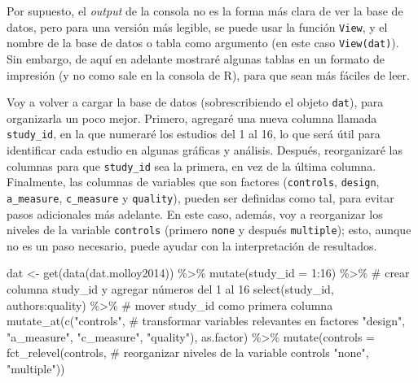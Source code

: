 \documentclass[
  bookmarksnumbered]{article}
\newenvironment{Shaded}{\begin{snugshade}}{\end{snugshade}}
\newcommand{\AttributeTok}[1]{\textcolor[rgb]{0.00,0.34,0.68}{#1}}
\newcommand{\CommentTok}[1]{\textcolor[rgb]{0.54,0.53,0.53}{#1}}
\newcommand{\DecValTok}[1]{\textcolor[rgb]{0.69,0.50,0.00}{#1}}
\newcommand{\FunctionTok}[1]{\textcolor[rgb]{0.39,0.29,0.61}{#1}}
\newcommand{\NormalTok}[1]{\textcolor[rgb]{0.12,0.11,0.11}{#1}}
\newcommand{\OtherTok}[1]{\textcolor[rgb]{0.00,0.43,0.16}{#1}}
\newcommand{\SpecialCharTok}[1]{\textcolor[rgb]{0.24,0.68,0.91}{#1}}
\newcommand{\StringTok}[1]{\textcolor[rgb]{0.75,0.01,0.01}{#1}}
\begin{document}
Por supuesto, el \emph{output} de la consola no es la forma más clara de ver la base de datos, pero para una versión más legible, se puede usar la función \texttt{View}, y el nombre de la base de datos o tabla como argumento (en este caso \texttt{View(dat)}). Sin embargo, de aquí en adelante mostraré algunas tablas en un formato de impresión (y no como sale en la consola de R), para que sean más fáciles de leer.

Voy a volver a cargar la base de datos (sobrescribiendo el objeto \texttt{dat}), para organizarla un poco mejor. Primero, agregaré una nueva columna llamada \texttt{study\_id}, en la que numeraré los estudios del 1 al 16, lo que será útil para identificar cada estudio en algunas gráficas y análisis. Después, reorganizaré las columnas para que \texttt{study\_id} sea la primera, en vez de la última columna. Finalmente, las columnas de variables que son factores (\texttt{controls}, \texttt{design}, \texttt{a\_measure}, \texttt{c\_measure} y \texttt{quality}), pueden ser definidas como tal, para evitar pasos adicionales más adelante. En este caso, además, voy a reorganizar los niveles de la variable \texttt{controls} (primero \texttt{none} y después \texttt{multiple}); esto, aunque no es un paso necesario, puede ayudar con la interpretación de resultados.

\begin{Shaded}
\begin{Highlighting}[]
\NormalTok{dat }\OtherTok{\textless{}{-}} \FunctionTok{get}\NormalTok{(}\FunctionTok{data}\NormalTok{(dat.molloy2014)) }\SpecialCharTok{\%\textgreater{}\%}
  \FunctionTok{mutate}\NormalTok{(}\AttributeTok{study\_id =} \DecValTok{1}\SpecialCharTok{:}\DecValTok{16}\NormalTok{)  }\SpecialCharTok{\%\textgreater{}\%} \CommentTok{\# crear columna \textquotesingle{}study\_id\textquotesingle{} y agregar números del 1 al 16}
  \FunctionTok{select}\NormalTok{(study\_id, authors}\SpecialCharTok{:}\NormalTok{quality) }\SpecialCharTok{\%\textgreater{}\%} \CommentTok{\# mover \textquotesingle{}study\_id\textquotesingle{} como primera columna}
  \FunctionTok{mutate\_at}\NormalTok{(}\FunctionTok{c}\NormalTok{(}\StringTok{"controls"}\NormalTok{, }\CommentTok{\# transformar variables relevantes en factores}
              \StringTok{"design"}\NormalTok{,}
              \StringTok{"a\_measure"}\NormalTok{,}
              \StringTok{"c\_measure"}\NormalTok{,}
              \StringTok{"quality"}\NormalTok{), }
\NormalTok{            as.factor) }\SpecialCharTok{\%\textgreater{}\%} 
  \FunctionTok{mutate}\NormalTok{(}\AttributeTok{controls =} \FunctionTok{fct\_relevel}\NormalTok{(controls, }\CommentTok{\# reorganizar niveles de la variable \textquotesingle{}controls\textquotesingle{}}
                                \StringTok{"none"}\NormalTok{, }\StringTok{"multiple"}\NormalTok{))  }
\end{Highlighting}
\end{Shaded}
\end{document}
